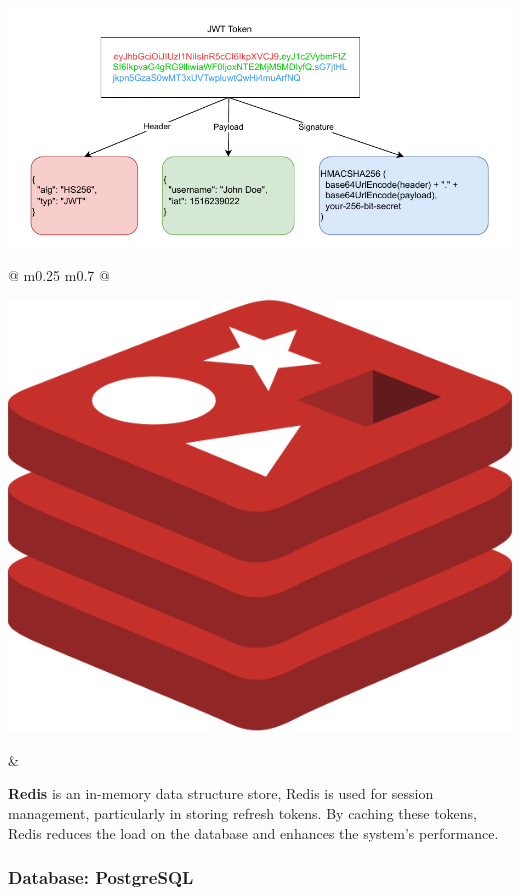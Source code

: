 	\begin{center}
		\includegraphics[width=1.1\columnwidth]{graphics/jwt-explained.pdf}
	\end{center}
	
	
		\vspace*{0.5cm}
	\begin{tabular}{ @{} m{0.25\textwidth} m{0.7\textwidth} @{} }
		\begin{minipage}{\linewidth}
			\centering
			\includegraphics[width=0.5\linewidth]{graphics/redis.png}
			\label{fig:redis}
		\end{minipage}
		&
		\begin{minipage}{\linewidth}
			\textbf{Redis} is an in-memory data structure store, Redis is used for session management, particularly in storing refresh tokens. By caching these tokens, Redis reduces the load on the database and enhances the system’s performance.
		\end{minipage}
	\end{tabular}
	
	
	
	\subsubsection{Database: PostgreSQL}
	
